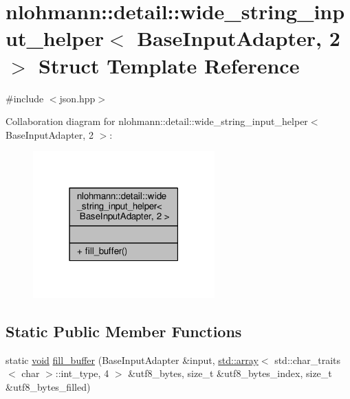 \hypertarget{structnlohmann_1_1detail_1_1wide__string__input__helper_3_01BaseInputAdapter_00_012_01_4}{}\section{nlohmann\+:\+:detail\+:\+:wide\+\_\+string\+\_\+input\+\_\+helper$<$ Base\+Input\+Adapter, 2 $>$ Struct Template Reference}
\label{structnlohmann_1_1detail_1_1wide__string__input__helper_3_01BaseInputAdapter_00_012_01_4}


{\ttfamily \#include $<$json.\+hpp$>$}



Collaboration diagram for nlohmann\+:\+:detail\+:\+:wide\+\_\+string\+\_\+input\+\_\+helper$<$ Base\+Input\+Adapter, 2 $>$\+:
\nopagebreak
\begin{figure}[H]
\begin{center}
\leavevmode
\includegraphics[width=198pt]{structnlohmann_1_1detail_1_1wide__string__input__helper_3_01BaseInputAdapter_00_012_01_4__coll__graph}
\end{center}
\end{figure}
\subsection*{Static Public Member Functions}
\begin{DoxyCompactItemize}
\item 
static \hyperlink{namespacenlohmann_1_1detail_a59fca69799f6b9e366710cb9043aa77d}{void} \hyperlink{structnlohmann_1_1detail_1_1wide__string__input__helper_3_01BaseInputAdapter_00_012_01_4_a293186006f5f8090e337d12571307ced}{fill\+\_\+buffer} (Base\+Input\+Adapter \&input, \hyperlink{namespacenlohmann_1_1detail_a1ed8fc6239da25abcaf681d30ace4985af1f713c9e000f5d3f280adbd124df4f5}{std\+::array}$<$ std\+::char\+\_\+traits$<$ char $>$\+::int\+\_\+type, 4 $>$ \&utf8\+\_\+bytes, size\+\_\+t \&utf8\+\_\+bytes\+\_\+index, size\+\_\+t \&utf8\+\_\+bytes\+\_\+filled)
\end{DoxyCompactItemize}


